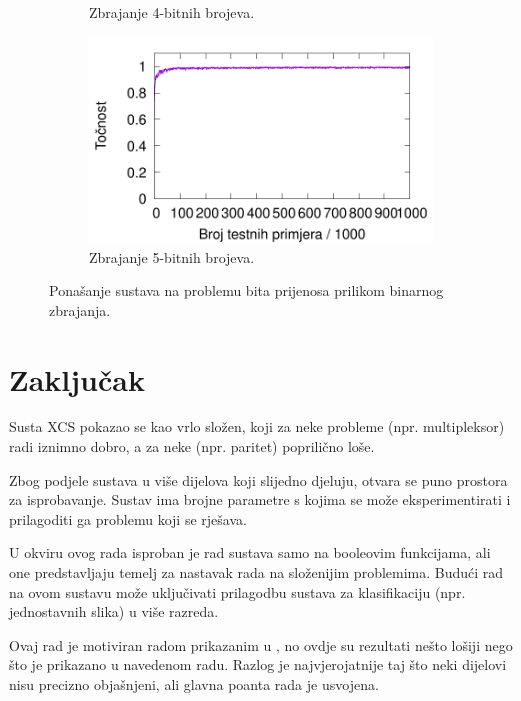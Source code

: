 \documentclass[times, utf8, zavrsni]{fer}
\begin{document}
\begin{figure}
\begin{subfigure}{0.496\textwidth}
        \caption{Zbrajanje 4-bitnih brojeva.}
        \label{fig:8care}
    \end{subfigure}
    \begin{subfigure}{0.496\textwidth}
        \centering
        \includegraphics[width=\textwidth]{img/carry/10care.pdf}
        \caption{Zbrajanje 5-bitnih brojeva.}
        \label{fig:10care}
    \end{subfigure}
    \caption{Ponašanje sustava na problemu bita prijenosa prilikom binarnog zbrajanja.}
    \label{fig:care}
\end{figure}

\chapter{Zaključak} \label{ch:zak}
Susta XCS pokazao se kao vrlo složen, koji za neke probleme (npr. multipleksor) radi iznimno dobro, a za neke (npr. paritet) poprilično loše.

Zbog podjele sustava u više dijelova koji slijedno djeluju, otvara se puno prostora za isprobavanje.
Sustav ima brojne parametre s kojima se može eksperimentirati i prilagoditi ga problemu koji se rješava.

U okviru ovog rada isproban je rad sustava samo na booleovim funkcijama, ali one predstavljaju temelj za nastavak rada na složenijim problemima.
Budući rad na ovom sustavu može uključivati prilagodbu sustava za klasifikaciju (npr. jednostavnih slika) u više razreda.

Ovaj rad je motiviran radom prikazanim u \citep{4}, no ovdje su rezultati nešto lošiji nego što je prikazano u navedenom radu.
Razlog je najvjerojatnije taj što neki dijelovi nisu precizno objašnjeni, ali glavna poanta rada je usvojena.
\end{document}
